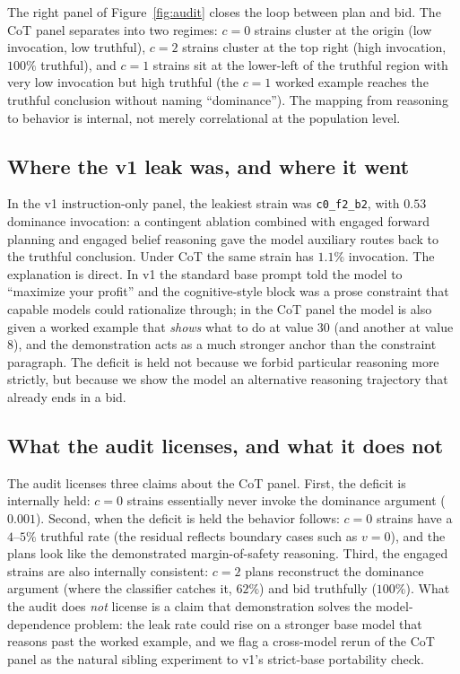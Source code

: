 \documentclass[12pt]{article}
\begin{document}
The right panel of Figure~\ref{fig:audit} closes the loop between
plan and bid. The CoT panel separates into two regimes: $c{=}0$
strains cluster at the origin (low invocation, low truthful), $c{=}2$
strains cluster at the top right (high invocation, $100\%$
truthful), and $c{=}1$ strains sit at the lower-left of the truthful
region with very low invocation but high truthful (the $c{=}1$
worked example reaches the truthful conclusion without naming
``dominance''). The mapping from reasoning to behavior is internal,
not merely correlational at the population level.

\subsection{Where the v1 leak was, and where it went}

In the v1 instruction-only panel, the leakiest strain was
\texttt{c0\_f2\_b2}, with $0.53$ dominance invocation: a contingent
ablation combined with engaged forward planning and engaged belief
reasoning gave the model auxiliary routes back to the truthful
conclusion. Under CoT the same strain has $1.1\%$ invocation. The
explanation is direct. In v1 the standard base prompt told the
model to ``maximize your profit'' and the cognitive-style block was
a prose constraint that capable models could rationalize through; in
the CoT panel the model is also given a worked example that
\emph{shows} what to do at value $30$ (and another at value $8$),
and the demonstration acts as a much stronger anchor than the
constraint paragraph. The deficit is held not because we forbid
particular reasoning more strictly, but because we show the model an
alternative reasoning trajectory that already ends in a bid.

\subsection{What the audit licenses, and what it does not}

The audit licenses three claims about the CoT panel. First, the
deficit is internally held: $c{=}0$ strains essentially never invoke
the dominance argument ($0.001$). Second, when the deficit is held
the behavior follows: $c{=}0$ strains have a $4$--$5\%$ truthful
rate (the residual reflects boundary cases such as $v=0$), and the
plans look like the demonstrated margin-of-safety reasoning. Third,
the engaged strains are also internally consistent: $c{=}2$ plans
reconstruct the dominance argument (where the classifier catches it,
$62\%$) and bid truthfully ($100\%$). What the audit does \emph{not}
license is a claim that demonstration solves the model-dependence
problem: the leak rate could rise on a stronger base model that
reasons past the worked example, and we flag a cross-model rerun of
the CoT panel as the natural sibling experiment to v1's strict-base
portability check.
\end{document}
